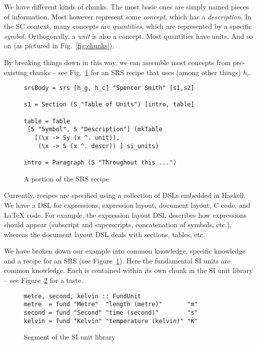 \documentclass{sig-alternate-05-2015}
\begin{document}
We have different kinds of chunks.  The most basic ones are simply named pieces
of information.  Most however represent some \emph{concept}, which has a
\emph{description}.  In the SC context, many concepts are \emph{quantities},
which are represented by a specific \emph{symbol}.  Orthogonally, a \emph{unit}
is also a concept.  Most quantities have units.  And so on (as pictured
in Fig.~\ref{fig:chunks}).

By breaking things down in this way, we can assemble most concepts from
pre-existing chunks -- see Fig.~\ref{fig:recipe} for an SRS recipe that
uses (among other things) $h_c$. %

\begin{figure}[tb]
\begin{lstlisting}[frame=single, 
  showstringspaces=false, basicstyle=\scriptsize]
srsBody = srs [h_g, h_c] "Spencer Smith" [s1,s2]

s1 = Section (S "Table of Units") [intro, table]

table = Table 
 [S "Symbol", S "Description"] (mkTable
   [(\x -> Sy (x ^. unit)),
    (\x -> S (x ^. descr)) ] si_units)

intro = Paragraph (S "Throughout this ...")
\end{lstlisting}
\caption{A portion of the SRS recipe}
\label{fig:recipe}
\end{figure}

Currently, recipes are specified using a collection of DSLs embedded in
Haskell.  We have a DSL for expressions, expression layout, document
layout, C code, and LaTeX code.  For example, the expression layout DSL
describes how expressions should appear (subscript and
superscripts, concatenation of symbols, etc.), whereas the document layout
DSL deals with sections, tables, etc.

We have broken down our example into common knowledge, specific knowledge
and a recipe for an SRS (see Figure~\ref{fig:recipe}).
Here the fundamental SI units are common knowledge. Each is
contained within its own chunk in the SI unit library -- see
Figure~\ref{fig:know_common} for a taste.

\begin{figure}[thb]
\begin{lstlisting}[frame=single, showstringspaces=false, 
  basicstyle=\scriptsize]
metre, second, kelvin :: FundUnit
metre  = fund "Metre"  "length (metre)"       "m"
second = fund "Second" "time (second)"        "s"
kelvin = fund "Kelvin" "temperature (kelvin)" "K"
\end{lstlisting}
\caption{Segment of the SI unit library}
\label{fig:know_common}
\end{figure}
\end{document}
